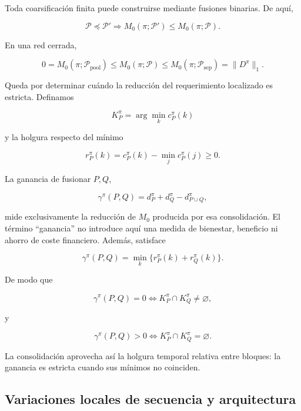 \documentclass[10pt,a5paper,twoside]{article}
\begin{document}
Toda coarsificación finita puede construirse mediante fusiones binarias.
De aquí,

\[
\mathcal P\preceq\mathcal P'
\Longrightarrow
M_0(\pi;\mathcal P')
\le
M_0(\pi;\mathcal P).
\]

En una red cerrada,

\[
0
=
M_0(\pi;\mathcal P_{\mathrm{pool}})
\le
M_0(\pi;\mathcal P)
\le
M_0(\pi;\mathcal P_{\mathrm{sep}})
=
\|D^\pi\|_1.
\]

Queda por determinar cuándo la reducción del requerimiento localizado es estricta. Definamos

\[
K^\pi_P
=
\arg\min_k c^\pi_P(k)
\]

y la holgura respecto del mínimo

\[
r^\pi_P(k)
=
c^\pi_P(k)-\min_jc^\pi_P(j)\ge0.
\]

La ganancia de fusionar \(P,Q\),

\[
\gamma^\pi(P,Q)
=
d^\pi_P+d^\pi_Q-d^\pi_{P\cup Q},
\]

mide exclusivamente la reducción de \(M_0\) producida por esa consolidación.
El término ``ganancia'' no introduce aquí una medida de bienestar, beneficio ni
ahorro de coste financiero. Además, satisface

\[
\gamma^\pi(P,Q)
=
\min_k\{r^\pi_P(k)+r^\pi_Q(k)\}.
\]

De modo que

\[
\gamma^\pi(P,Q)=0
\iff
K^\pi_P\cap K^\pi_Q\neq\varnothing,
\]

y

\[
\gamma^\pi(P,Q)>0
\iff
K^\pi_P\cap K^\pi_Q=\varnothing.
\]

La consolidación aprovecha así la holgura temporal relativa entre bloques:
la ganancia es estricta cuando sus mínimos no coinciden.

\subsection{Variaciones locales de secuencia y arquitectura}\label{variaciones-locales-secuencia-arquitectura}
\end{document}

